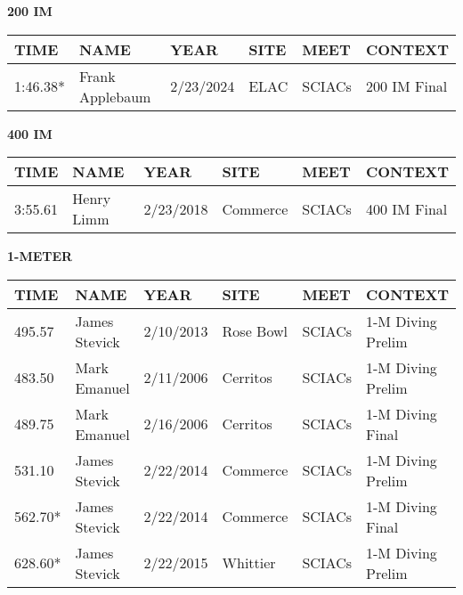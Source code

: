 \begin{minipage}[t]{0.48\textwidth}
\centering
\textbf{200 IM}\\[0.05cm]
\begin{tabular}{@{}p{1.8cm}p{2.8cm}p{1.2cm}p{1.4cm}p{1.4cm}p{2.0cm}@{}}
\hline
\textbf{TIME} & \textbf{NAME} & \textbf{YEAR} & \textbf{SITE} & \textbf{MEET} & \textbf{CONTEXT} \\
\hline
1:46.38* & Frank Applebaum & 2/23/2024 & ELAC & SCIACs & 200 IM Final \\
\hline
\end{tabular}
\end{minipage}\hfill
\begin{minipage}[t]{0.48\textwidth}
\centering
\textbf{400 IM}\\[0.05cm]
\begin{tabular}{@{}p{1.8cm}p{2.8cm}p{1.2cm}p{1.4cm}p{1.4cm}p{2.0cm}@{}}
\hline
\textbf{TIME} & \textbf{NAME} & \textbf{YEAR} & \textbf{SITE} & \textbf{MEET} & \textbf{CONTEXT} \\
\hline
3:55.61 & Henry Limm & 2/23/2018 & Commerce & SCIACs & 400 IM Final \\
\hline
\end{tabular}
\end{minipage}

\vspace{0.4cm}

\begin{center}
\begin{minipage}[t]{0.7\textwidth}
\centering
\textbf{1-METER}\\[0.05cm]
\begin{tabular}{@{}p{1.8cm}p{2.8cm}p{1.2cm}p{1.4cm}p{1.4cm}p{2.0cm}@{}}
\hline
\textbf{TIME} & \textbf{NAME} & \textbf{YEAR} & \textbf{SITE} & \textbf{MEET} & \textbf{CONTEXT} \\
\hline
495.57 & James Stevick & 2/10/2013 & Rose Bowl & SCIACs & 1-M Diving Prelim \\
483.50 & Mark Emanuel & 2/11/2006 & Cerritos & SCIACs & 1-M Diving Prelim \\
489.75 & Mark Emanuel & 2/16/2006 & Cerritos & SCIACs & 1-M Diving Final \\
531.10 & James Stevick & 2/22/2014 & Commerce & SCIACs & 1-M Diving Prelim \\
562.70* & James Stevick & 2/22/2014 & Commerce & SCIACs & 1-M Diving Final \\
628.60* & James Stevick & 2/22/2015 & Whittier & SCIACs & 1-M Diving Prelim \\
\hline
\end{tabular}
\end{minipage}
\end{center}

